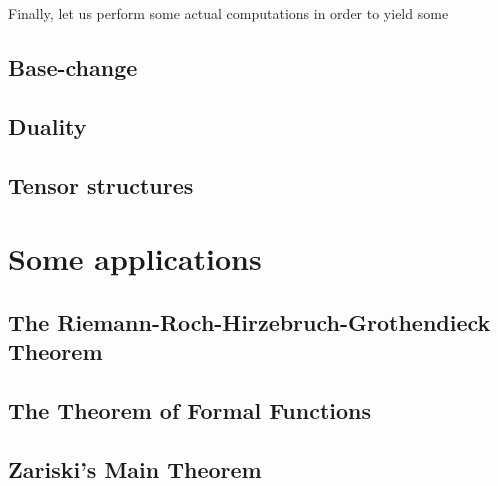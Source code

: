             Finally, let us perform some actual computations in order to yield some 

        \subsection{Base-change}

        \subsection{Duality}

        \subsection{Tensor structures}

    \section{Some applications}
        \subsection{The Riemann-Roch-Hirzebruch-Grothendieck Theorem}
    
        \subsection{The Theorem of Formal Functions}

        \subsection{Zariski's Main Theorem}
    
    \printbibliography

